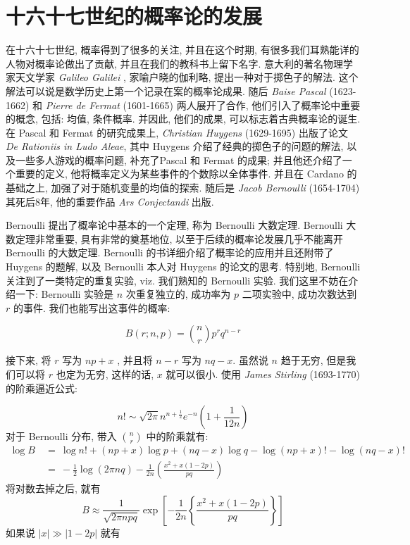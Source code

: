 \documentclass[a4paper, 10pt]{ctexart} %
\begin{document}
\section{十六十七世纪的概率论的发展}
在十六十七世纪, 概率得到了很多的关注, 并且在这个时期, 有很多我们耳熟能详的人物对概率论做出了贡献, 并且在我们的教科书上留下名字. 
意大利的著名物理学家天文学家 {\em Galileo Galilei} , 家喻户晓的伽利略, 提出一种对于掷色子的解法. 这个解法可以说是数学历史上第一个记录在案的概率论成果. 
随后 {\em Baise Pascal} (1623-1662) 和 {\em Pierre de Fermat} (1601-1665) 两人展开了合作, 他们引入了概率论中重要的概念, 包括: 均值, 条件概率. 并因此, 他们的成果, 可以标志着古典概率论的诞生. 
在 Pascal 和 Fermat 的研究成果上, {\em Christian Huygens} (1629-1695) 出版了论文 {\em De Rationiis in Ludo Aleae}, 其中 Huygens 介绍了经典的掷色子的问题的解法, 以及一些多人游戏的概率问题, 补充了Pascal 和 Fermat 的成果; 并且他还介绍了一个重要的定义, 他将概率定义为某些事件的个数除以全体事件. 
并且在 Cardano 的基础之上, 加强了对于随机变量的均值的探索. 随后是 {\em Jacob Bernoulli} (1654-1704) 其死后8年, 他的重要作品 {\em Ars Conjectandi} 出版. 

Bernoulli 提出了概率论中基本的一个定理, 称为 Bernoulli 大数定理. 
Bernoulli 大数定理非常重要, 具有非常的奠基地位, 以至于后续的概率论发展几乎不能离开 Bernoulli 的大数定理. 
Bernoulli 的书详细介绍了概率论的应用并且还附带了 Huygens 的题解, 以及 Bernoulli 本人对 Huygens 的论文的思考. 
特别地, Bernoulli 
关注到了一类特定的重复实验, viz. 我们熟知的 Bernoulli 实验. 我们这里不妨在介绍一下: Bernoulli 实验是 $n$ 次重复独立的, 成功率为 $p$ 二项实验中, 成功次数达到 $r$ 的事件. 我们也能写出这事件的概率:

\[
B \left( r ; n , p\right) = \binom{n}{r} p ^{r} q ^{n-r}
\]

接下来, 将 $r$ 写为 $n p + x$ , 并且将 $n - r$ 写为 $ nq  -x $. 虽然说 $n$ 趋于无穷, 但是我们可以将 $r$ 也定为无穷, 这样的话, $x$ 就可以很小. 使用 {\em James Stirling} (1693-1770)的阶乘逼近公式:

\[
n ! \sim \sqrt{2\pi} n ^{n + \frac{1}{2} } e ^{ -n} \left(1 + \frac{1}{12 n}\right)
\]
对于 Bernoulli 分布, 带入 $\binom{n}{r}$ 中的阶乘就有:
\[
\begin{aligned}
    \log  B \ & =\  \log  n! + \left( n p+ x\right) \log p + \left(nq - x\right) \log  q - \log  \left(n p + x\right) !  - \log \left(n q - x\right) ! \\
    & = \ -\frac{1}{2} \log  \left(2\pi nq \right) - \frac{1}{2n} \left( \frac{x ^{2} + x \left(1-2p\right)}{pq}\right)
\end{aligned}
\]
将对数去掉之后, 就有
\[
B \approx \frac{1}{\sqrt{2\pi n pq}} \exp \left[ - \frac{1}{2n} \left\{\frac{x^{2} + x \left(1-2p\right)}{pq}\right\} \right]
\]
如果说 $\left| x \right| \gg \left| 1- 2p \right| $ 就有 
\end{document}
